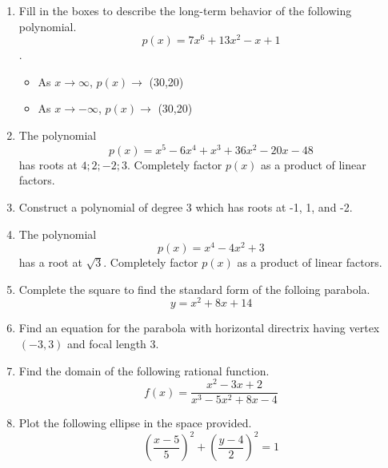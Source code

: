 \documentclass{article}
\begin{document}
\TestTitle[class={College Algebra}, name={Test 3}, term={Spring}, date={Oct. 19}, year={2015}, form={A}]

\AlgebraFacts[geom={show}]

\begin{enumerate}
\item Fill in the boxes to describe the long-term behavior of the following polynomial. \[ p(x) = 7x^6 + 13x^2 - x + 1 \].

\begin{itemize}
\item As $x \rightarrow \infty$, $p(x) \rightarrow$ \framebox(30,20){} \vspace{0.5cm}
\item As $x \rightarrow -\infty$, $p(x) \rightarrow$ \framebox(30,20){}
\end{itemize} \vspace{1cm}

\item The polynomial \[ p(x) = x^5 - 6x^4 + x^3 + 36x^2 - 20x - 48 \] has roots at ${4;2;-2;3}$. Completely factor $p(x)$ as a product of linear factors. \vspace{6cm}

\item Construct a polynomial of degree 3 which has roots at -1, 1, and -2. \vspace{5cm}

\newpage

\item The polynomial \[ p(x) = x^4 - 4x^2 + 3 \] has a root at $\sqrt{3}$. Completely factor $p(x)$ as a product of linear factors. \vspace{9cm}

\item Complete the square to find the standard form of the folloing parabola. \[ y = x^2 + 8x + 14 \] \vspace{6cm}

\item Find an equation for the parabola with horizontal directrix having vertex $(-3, 3)$ and focal length 3. \vspace{2cm}

\newpage

\item Find the domain of the following rational function. \[ f(x) = \frac{x^2 - 3x + 2}{x^3 - 5x^2 + 8x - 4} \] \vspace{5cm}

\item Plot the following ellipse in the space provided. \[ \left(\frac{x - 5}{5}\right)^2 + \left(\frac{y - 4}{2}\right)^2 = 1 \]


\end{enumerate}
\end{document}
